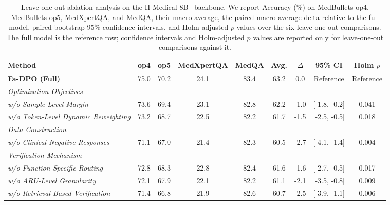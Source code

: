 \documentclass[a4paper,fleqn,doubleblind]{cas-sc}
\begin{document}
\begin{table}[htbp]
    \centering
    \renewcommand{\arraystretch}{1.1} 
    \scriptsize
    \setlength{\tabcolsep}{3pt}
    \caption[Ablation analysis on component effectiveness within Fa-DPO.]{Leave-one-out ablation analysis on the II-Medical-8B~\cite{intelligentinternet2025iimedical8b} backbone. We report Accuracy (\%) on MedBullets-op4, MedBullets-op5, MedXpertQA, and MedQA, their macro-average, the paired macro-average delta relative to the full model, paired-bootstrap 95\% confidence intervals, and Holm-adjusted $p$ values over the six leave-one-out comparisons. The full model is the reference row; confidence intervals and Holm-adjusted $p$ values are reported only for leave-one-out comparisons against it.}
    \label{tab:ablation}
    \begin{adjustbox}{max width=\textwidth}
        \begin{tabular}{lcccccccc} 
            \toprule
            \textbf{Method} & \textbf{op4} & \textbf{op5} & \textbf{MedXpertQA} & \textbf{MedQA} & \textbf{Avg.} & \textbf{$\Delta$} & \textbf{95\% CI} & \textbf{Holm $p$} \\
            \midrule
            \textbf{Fa-DPO (Full)} & 75.0 & 70.2 & 24.1 & 83.4 & 63.2 & 0.0 & Reference & Reference \\
            \midrule
            \multicolumn{9}{l}{\textit{Optimization Objectives}} \\
            \quad \textit{w/o Sample-Level Margin} & 73.6 & 69.4 & 23.1 & 82.8 & 62.2 & -1.0 & [-1.8, -0.2] & 0.041 \\
            \quad \textit{w/o Token-Level Dynamic Reweighting} & 73.2 & 68.7 & 22.5 & 82.2 & 61.7 & -1.5 & [-2.5, -0.5] & 0.018 \\
            \midrule
            \multicolumn{9}{l}{\textit{Data Construction}} \\
            \quad \textit{w/o Clinical Negative Responses} & 71.1 & 67.0 & 21.4 & 82.3 & 60.5 & -2.7 & [-4.1, -1.4] & 0.004 \\
            \midrule
            \multicolumn{9}{l}{\textit{Verification Mechanism}} \\
            \quad \textit{w/o Function-Specific Routing} & 72.8 & 68.3 & 22.8 & 82.4 & 61.6 & -1.6 & [-2.7, -0.5] & 0.017 \\
            \quad \textit{w/o ARU-Level Granularity} & 72.1 & 67.9 & 22.1 & 82.2 & 61.1 & -2.1 & [-3.5, -0.8] & 0.009 \\
            \quad \textit{w/o Retrieval-Based Verification} & 71.4 & 66.8 & 21.9 & 82.6 & 60.7 & -2.5 & [-3.9, -1.1] & 0.006 \\
            \bottomrule
        \end{tabular}
    \end{adjustbox}
\end{table}
\end{document}
